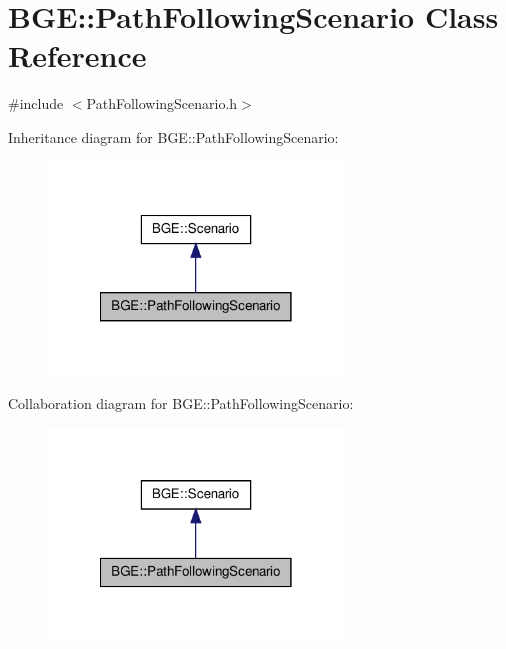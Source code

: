 \hypertarget{class_b_g_e_1_1_path_following_scenario}{\section{B\-G\-E\-:\-:Path\-Following\-Scenario Class Reference}
\label{class_b_g_e_1_1_path_following_scenario}
}


{\ttfamily \#include $<$Path\-Following\-Scenario.\-h$>$}



Inheritance diagram for B\-G\-E\-:\-:Path\-Following\-Scenario\-:
\nopagebreak
\begin{figure}[H]
\begin{center}
\leavevmode
\includegraphics[width=222pt]{class_b_g_e_1_1_path_following_scenario__inherit__graph}
\end{center}
\end{figure}


Collaboration diagram for B\-G\-E\-:\-:Path\-Following\-Scenario\-:
\nopagebreak
\begin{figure}[H]
\begin{center}
\leavevmode
\includegraphics[width=222pt]{class_b_g_e_1_1_path_following_scenario__coll__graph}
\end{center}
\end{figure}
